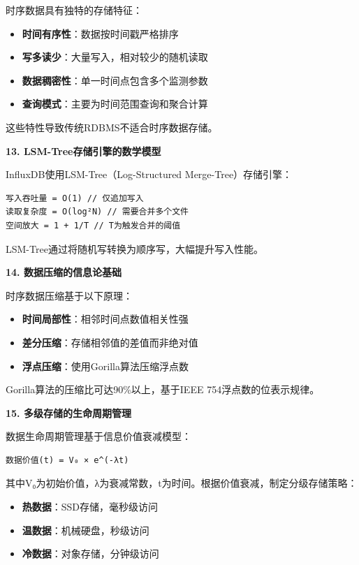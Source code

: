 时序数据具有独特的存储特征：

\begin{itemize}
\tightlist
\item
  \textbf{时间有序性}：数据按时间戳严格排序
\item
  \textbf{写多读少}：大量写入，相对较少的随机读取
\item
  \textbf{数据稠密性}：单一时间点包含多个监测参数
\item
  \textbf{查询模式}：主要为时间范围查询和聚合计算
\end{itemize}

这些特性导致传统RDBMS不适合时序数据存储。

\textbf{13. LSM-Tree存储引擎的数学模型}

InfluxDB使用LSM-Tree（Log-Structured Merge-Tree）存储引擎：

\begin{lstlisting}
写入吞吐量 = O(1) // 仅追加写入
读取复杂度 = O(log²N) // 需要合并多个文件
空间放大 = 1 + 1/T // T为触发合并的阈值
\end{lstlisting}

LSM-Tree通过将随机写转换为顺序写，大幅提升写入性能。

\textbf{14. 数据压缩的信息论基础}

时序数据压缩基于以下原理：

\begin{itemize}
\tightlist
\item
  \textbf{时间局部性}：相邻时间点数值相关性强
\item
  \textbf{差分压缩}：存储相邻值的差值而非绝对值
\item
  \textbf{浮点压缩}：使用Gorilla算法压缩浮点数
\end{itemize}

Gorilla算法的压缩比可达90\%以上，基于IEEE 754浮点数的位表示规律。

\textbf{15. 多级存储的生命周期管理}

数据生命周期管理基于信息价值衰减模型：

\begin{lstlisting}
数据价值(t) = V₀ × e^(-λt)
\end{lstlisting}

其中V₀为初始价值，λ为衰减常数，t为时间。根据价值衰减，制定分级存储策略：

\begin{itemize}
\tightlist
\item
  \textbf{热数据}：SSD存储，毫秒级访问
\item
  \textbf{温数据}：机械硬盘，秒级访问\\
\item
  \textbf{冷数据}：对象存储，分钟级访问
\end{itemize}

